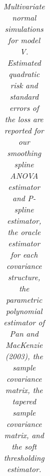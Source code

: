 \begin{landscape}
\begin{table}[H]
\centering
\begin{scriptsize}
\caption{\textit{Multivariate normal simulations for model V. Estimated quadratic risk and standard errors of the loss are reported for our smoothing spline ANOVA estimator and P-spline estimator, the oracle estimator for each covariance structure, the parametric polynomial estimator of Pan and MacKenzie (2003), the sample covariance matrix, the tapered sample covariance matrix,
                        and the soft thresholding estimator.}} 
\label{table:master-quad-risk-table}
\begin{tabular}{lrrrlrlrlrlrlrlrl}

\end{tabular}
\end{scriptsize}
\end{table}
\end{landscape}
